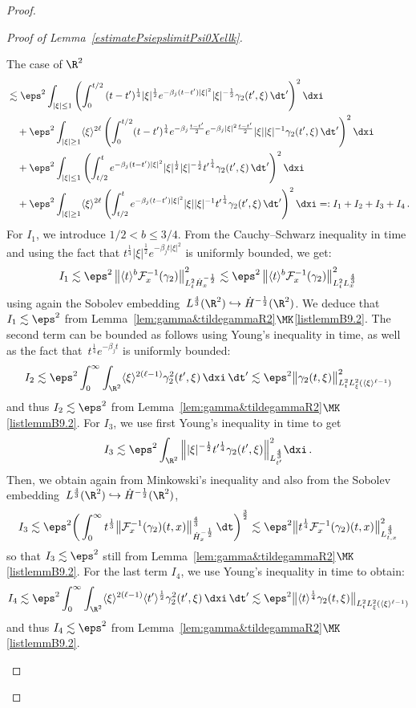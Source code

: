 \begin{proof}
\begin{proof}[{Proof of Lemma~\ref{estimatePsiepslimitPsi0Xellk}}]
\begin{step}{The case of $\R^2$}
\begin{align*}
& \lesssim \eps^2 \int_{|\xi|\le 1} \left(\int_0^{t/2} {(t-{t'})^{\frac14} |\xi|^\frac12} e^{-\beta_j(t-{t'})|\xi|^2} {|\xi|^{-\frac12}}{\gamma_2}({t'},\xi) \, \dt' \right)^2 \dxi \\
&\quad + \eps^2 \int_{|\xi| \ge 1} \langle \xi \rangle^{2\ell} \left(\int_0^{t/2} (t-{t'})^{\frac14} e^{-\beta_j\frac{t-t'}{2}} e^{-\beta_j|\xi|^2 \frac{t-t'}{2}} |\xi| |\xi|^{-1} {\gamma_2}({t'},\xi) \, \dt' \right)^2 \dxi \\
&\quad + \eps^2 \int_{|\xi|\le 1} \left(\int_{t/2}^{t} e^{-\beta_j(t-{t'})|\xi|^2} {|\xi|^{\frac12} |\xi|^{-\frac12}{t'}^{\frac14}} {\gamma_2}({t'},\xi) \, \dt' \right)^2 \dxi \\
&\quad + \eps^2 \int_{|\xi| \ge 1}\langle \xi \rangle^{2\ell} \left(\int_{t/2}^{t} e^{-\beta_j(t-{t'})|\xi|^2} |\xi| |\xi|^{-1} {t'}^{\frac14} {\gamma_2}({t'},\xi) \, \dt' \right)^2 \dxi =: I_1+I_2+I_3+I_4 \,.
\end{align*}
For $I_1$, we introduce $1/2<b\le3/4$. From the Cauchy--Schwarz inequality in time and using the fact that $t^{\frac14} |\xi| ^{\frac12} e^{- \beta_j t |\xi|^2}$ is uniformly bounded, we get:
\[
I_1 \lesssim \eps^2 \left\|\langle t \rangle^{b} {\mathcal F}_x^{-1} (\gamma_2) \right\|^2_{L^2_t \dot H^{-\frac12}_x} \lesssim \eps^2 \left\|\langle t \rangle^{b} {\mathcal F}_x^{-1} (\gamma_2) \right\|^2_{L^2_t L^{\frac43}_x}
\]
using again the Sobolev embedding~$L^\frac43(\R^2)\hookrightarrow \dot H^{-\frac12}(\R^2)$. We deduce that $I_1 \lesssim \eps^2$ from Lemma~\ref{lem:gamma&tildegammaR2}$\MK$\eqref{listlemmB9.2}. The second term can be bounded as follows using Young's inequality in time, as well as the fact that~$t^{\frac14} e^{- \beta_j t }$ is uniformly bounded:
\[
I_2 \lesssim \eps^2 \int_0^\infty \int_{\R^2} \langle \xi \rangle^{2(\ell-1)} \gamma_2^2(t',\xi) \, \dxi \, \dt'
\lesssim \eps^2{ \big \| \gamma_2(t,\xi) \big\|^2_{L^2_t L^2_\xi(\langle \xi \rangle^{\ell-1})}}
\]
and thus $I_2 \lesssim \eps^2$ from Lemma~\ref{lem:gamma&tildegammaR2}$\MK$\eqref{listlemmB9.2}. For $I_3$, we use first Young's inequality in time to get
\[
I_3 \lesssim \eps^2 \int_{\R^2} \Big\| |\xi|^{-\frac12} t'^{\frac14} {\gamma_2}(t',\xi) \Big\|_{L^{\frac43}_{t'}}^2 \dxi \,.
\]
Then, we obtain again from Minkowski's inequality and also from the Sobolev embedding~$L^\frac43(\R^2)\hookrightarrow \dot H^{-\frac12}(\R^2)$,
\[
I_3 \lesssim \eps^2 \bigg(\int_0^\infty t^{\frac13}{\big \| \mathcal{F}_x^{-1}(\gamma_2) (t,x)\big \|_{\dot H^{-\frac12}_x}^{\frac43}} \, \dt \bigg)^\frac32\lesssim \eps^2 {\big\| t^{\frac14} \mathcal{F}_x^{-1}(\gamma_2)(t,x)\big\|^2_{L^{\frac43}_{t,x}}}
\]
so that $I_3 \lesssim \eps^2$ still from Lemma~\ref{lem:gamma&tildegammaR2}$\MK$\eqref{listlemmB9.2}. For the last term $I_4$, we use Young's inequality in time to obtain:
\[
I_4\lesssim \eps^2 \int_0^\infty \int_{\R^2} \langle \xi \rangle^{2(\ell-1)} \langle t' \rangle^\frac12 \gamma_2^2(t',\xi) \, \dxi \, \dt'
\lesssim \eps^2{\big \|\langle t \rangle^{\frac14}\gamma_2(t,\xi) \big \|_{L^2_t L^2_\xi(\langle \xi \rangle^{\ell-1})}}
\]
and thus $I_4 \lesssim \eps^2$ from Lemma~\ref{lem:gamma&tildegammaR2}$\MK$\eqref{listlemmB9.2}.


\end{step}
\end{proof}
\end{proof}
